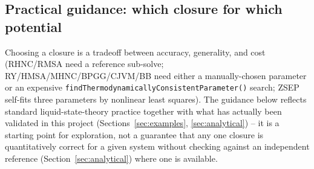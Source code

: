 \documentclass[11pt,a4paper]{article}
\newcommand{\code}[1]{\texttt{#1}}
\begin{document}
\subsection{Practical guidance: which closure for which potential}
\label{sec:recommendations}

Choosing a closure is a tradeoff between accuracy, generality, and cost
(RHNC/RMSA need a reference sub-solve; RY/HMSA/MHNC/BPGG/CJVM/BB need either
a manually-chosen parameter or an expensive
\code{findThermodynamicallyConsistentParameter()} search;
ZSEP self-fits three parameters by nonlinear least squares). The guidance
below reflects standard liquid-state-theory practice together with what has
actually been validated in this project (Sections~\ref{sec:examples},
\ref{sec:analytical}) -- it is a starting point for exploration, not a
guarantee that any one closure is quantitatively correct for a given system
without checking against an independent reference (Section~\ref{sec:analytical})
where one is available.
\end{document}
